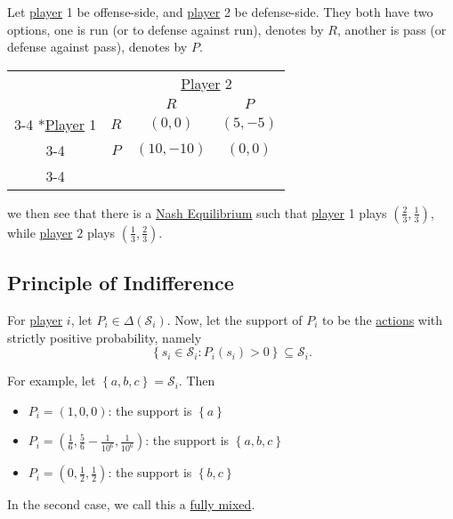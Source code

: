 \begin{eg}[Football]\label{eg:football}
	Let \hyperref[def:player]{player} 1 be offense-side, and \hyperref[def:player]{player} 2 be defense-side. They both have two options, one is run (or to defense against run), denotes by \(R\), another is pass (or defense against pass), denotes by \(P\).
	\begin{table}[H]
		\centering
		\setlength{\extrarowheight}{2pt}
		\begin{tabular}{cc|c|c|}
			                                               & \multicolumn{1}{c}{} & \multicolumn{2}{c}{\hyperref[def:player]{Player} 2}                           \\
			                                               & \multicolumn{1}{c}{} & \multicolumn{1}{c}{$R$}                             & \multicolumn{1}{c}{$P$} \\\cline{3-4}
			\multirow{2}*{\hyperref[def:player]{Player} 1} & $R$                  & $(0, 0)$                                            & $(5, -5)$               \\\cline{3-4}
			                                               & $P$                  & $(10, -10)$                                         & $(0, 0)$                \\\cline{3-4}
		\end{tabular}
	\end{table}
	we then see that there is a \hyperref[def:Nash-equilibrium]{Nash Equilibrium} such that \hyperref[def:player]{player} 1 plays \((\frac{2}{3}, \frac{1}{3})\), while \hyperref[def:player]{player} \(2\) plays \((\frac{1}{3}, \frac{2}{3})\).
\end{eg}

\subsection{Principle of Indifference}
For \hyperref[def:player]{player} \(i\), let \(P_i\in \Delta(\mathcal{S}_{i})\). Now, let the support of \(P_{i}\) to be the \hyperref[def:strategy]{actions} with strictly positive probability, namely
\[
	\left\{s_{i}\in \mathcal{S}_{i}\colon P_{i}(s_{i})>0\right\}\subseteq \mathcal{S}_{i}.
\]

\begin{eg}
	For example, let \(\left\{a, b, c\right\} = \mathcal{S}_{i}\). Then
	\begin{itemize}
		\item \(P_{i} = (1, 0, 0)\): the support is \(\left\{a\right\}\)
		\item \(P_{i} = (\frac{1}{6}, \frac{5}{6} - \frac{1}{10^6}, \frac{1}{10^6})\): the support is \(\left\{a, b, c\right\}\)
		\item \(P_{i} = (0, \frac{1}{2}, \frac{1}{2})\): the support is \(\left\{b, c\right\}\)
	\end{itemize}
	\begin{note}
		In the second case, we call this a \hyperref[def:fully-mixed]{fully mixed}.
	\end{note}
\end{eg}

